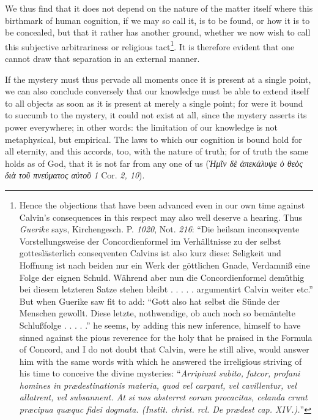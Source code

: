 \documentclass[12pt]{book}
\newcommand{\opage}[1]{\marginnote{\footnotesize\textit{[#1]}}}
\begin{document}
We thus find that it does not depend on the nature of the matter itself where
this birthmark of human cognition, if we may so call it, is to be found, or how
it is to be concealed, but that it rather has another ground, whether we now
wish to call this subjective arbitrariness or religious tact\footnote{Hence the
objections that have been advanced even in our own time against Calvin's
consequences in this respect may also well deserve a hearing. Thus
\emph{Guerike} says, Kirchengesch. P. \textit{1020}, Not. \textit{216}: ``Die
heilsam inconseqvente Vorstellungsweise der Concordienformel im Verhälltnisse zu
der selbst gotteslästerlich conseqventen Calvins ist also kurz diese: Seligkeit
und Hoffnung ist nach beiden nur ein Werk der göttlichen Gnade, Verdamniß eine
Folge der eignen Schuld. Während aber nun die Concordienformel demüthig bei
diesem letzteren Satze stehen bleibt . . . . . argumentirt Calvin weiter etc.''
But when Guerike saw fit to add: ``Gott also hat selbst die Sünde der Menschen
gewollt. Diese letzte, nothwendige, ob auch noch so bemäntelte Schlußfolge
. . . . .'' he seems, by adding this new inference, himself to have sinned
against the pious reverence for the holy that he praised in the Formula of
Concord, and I do not doubt that Calvin, were he still alive, would answer him
with the same words with which he answered the irreligious striving of his time
to conceive the divine mysteries: ``\textit{Arripiunt subito, fatcor, profani
homines in prædestinationis materia, quod vel carpant, vel cavillentur, vel
allatrent, vel subsannent. At si nos absterret eorum procacitas, celanda crunt
præcipua quæquc fidei dogmata. (Instit. christ. rcl. De prædest cap.
XIV.).}''}. It is therefore evident that one cannot draw that separation in an
external manner.

\opage{51} %
If the mystery must thus pervade all moments once it is present at a single
point, we can also conclude conversely that our knowledge must be able to
extend itself to all objects as soon as it is present at merely a single point;
for were it bound to succumb to the mystery, it could not exist at all, since
the mystery asserts its power everywhere; in other words: the limitation of our
knowledge is not metaphysical, but empirical. The laws to which our cognition
is bound hold for all eternity, and this accords, too, with the nature of truth;
for of truth the same holds as of God, that it is not far from any one of us
(\textit{Ἡμῖν δὲ ἀπεκάλυψε ὁ θεὸς διὰ τοῦ πνεύματος αὐτοῦ} \textit{1} Cor.
\textit{2, 10}).
\end{document}
